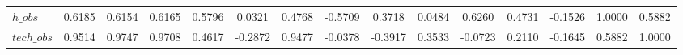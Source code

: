\begin{center}
\begin{longtable}{lcccccccccccccc}
$h\_obs         $	 & 	           0.6185	 & 	           0.6154	 & 	           0.6165	 & 	           0.5796	 & 	           0.0321	 & 	           0.4768	 & 	          -0.5709	 & 	           0.3718	 & 	           0.0484	 & 	           0.6260	 & 	           0.4731	 & 	          -0.1526	 & 	           1.0000	 & 	           0.5882 \\ 
$tech\_obs      $	 & 	           0.9514	 & 	           0.9747	 & 	           0.9708	 & 	           0.4617	 & 	          -0.2872	 & 	           0.9477	 & 	          -0.0378	 & 	          -0.3917	 & 	           0.3533	 & 	          -0.0723	 & 	           0.2110	 & 	          -0.1645	 & 	           0.5882	 & 	           1.0000 \\ 
\end{longtable}
 \end{center}
